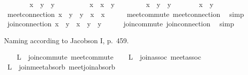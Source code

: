 \begin{isabellebody}
\isanewline
\ \ \ \ \isamarkupfalse%
\ \isamarkupfalse%
\ {\isachardoublequoteopen}x\ {\isasymsqunion}\ y\ {\isacharequal}\ y{\isachardoublequoteclose}\ \isacommand{{\isachardot}{\isachardot}}\isamarkupfalse%
\isanewline
\ \ \isamarkupfalse%
\isanewline
\ \ \ \ \isamarkupfalse%
\ {\isachardoublequoteopen}x\ {\isasymsqsubseteq}\ x\ {\isasymsqunion}\ y{\isachardoublequoteclose}\ \isacommand{{\isachardot}{\isachardot}}\isamarkupfalse%
\isanewline
\ \ \ \ \isamarkupfalse%
\ \isamarkupfalse%
\ {\isachardoublequoteopen}x\ {\isasymsqunion}\ y\ {\isacharequal}\ y{\isachardoublequoteclose}\isanewline
\ \ \ \ \isamarkupfalse%
\ \isamarkupfalse%
\ {\isachardoublequoteopen}x\ {\isasymsqsubseteq}\ y{\isachardoublequoteclose}\ \isacommand{{\isachardot}}\isamarkupfalse%
\isanewline
\ \ \isamarkupfalse%
\isanewline
\isanewline
\ \ \isamarkupfalse%
\ meet{\isacharunderscore}connection{}{\isacharcolon}\ {\isachardoublequoteopen}{\isacharparenleft}x\ {\isasymsqsubseteq}\ y{\isacharparenright}\ {\isacharequal}\ {\isacharparenleft}y\ {\isasymsqinter}\ x\ {\isacharequal}\ x{\isacharparenright}{\isachardoublequoteclose}\isanewline
\ \ \ \ \isamarkupfalse%
\ meet{\isacharunderscore}commute\ meet{\isacharunderscore}connection\ \isamarkupfalse%
\ simp\isanewline
\isanewline
\ \ \isamarkupfalse%
\ join{\isacharunderscore}connection{}{\isacharcolon}\ {\isachardoublequoteopen}{\isacharparenleft}x\ {\isasymsqsubseteq}\ y{\isacharparenright}\ {\isacharequal}\ {\isacharparenleft}x\ {\isasymsqunion}\ y\ {\isacharequal}\ y{\isacharparenright}{\isachardoublequoteclose}\isanewline
\ \ \ \ \isamarkupfalse%
\ join{\isacharunderscore}commute\ join{\isacharunderscore}connection\ \isamarkupfalse%
\ simp%
\begin{isamarkuptext}%
Naming according to Jacobson I, p.\ 459.%
\end{isamarkuptext}%
\isamarkuptrue%
\ \ \isamarkupfalse%
\ L{}\ {\isacharequal}\ join{\isacharunderscore}commute\ meet{\isacharunderscore}commute\isanewline
\ \ \isamarkupfalse%
\ L{}\ {\isacharequal}\ join{\isacharunderscore}assoc\ meet{\isacharunderscore}assoc\isanewline
\ \ \isanewline
\ \ \isamarkupfalse%
\ L{}\ {\isacharequal}\ join{\isacharunderscore}meet{\isacharunderscore}absorb\ meet{\isacharunderscore}join{\isacharunderscore}absorb%

\end{isabellebody}
